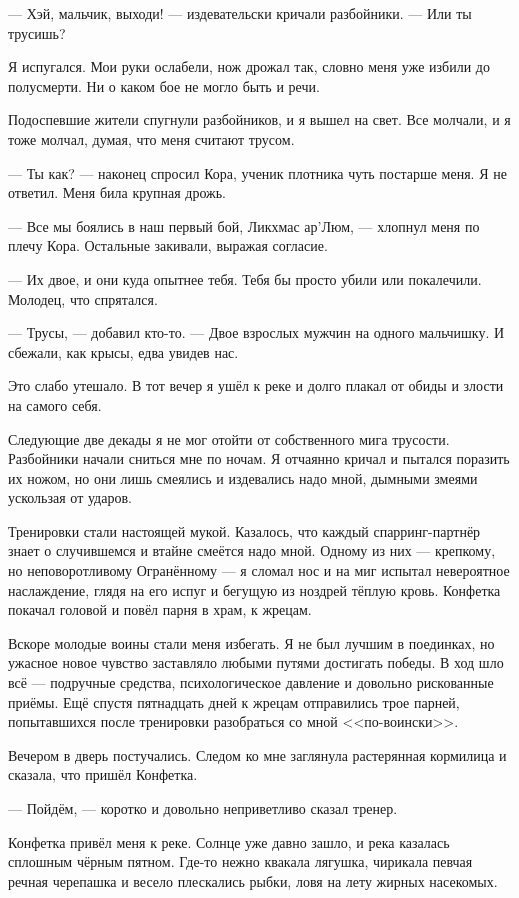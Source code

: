 --- Хэй, мальчик, выходи! --- издевательски кричали разбойники.
--- Или ты трусишь?

Я испугался.
Мои руки ослабели, нож дрожал так, словно меня уже избили до полусмерти.
Ни о каком бое не могло быть и речи.

Подоспевшие жители спугнули разбойников, и я вышел на свет.
Все молчали, и я тоже молчал, думая, что меня считают трусом.

--- Ты как? --- наконец спросил Кора, ученик плотника чуть постарше меня.
Я не ответил.
Меня била крупная дрожь.

--- Все мы боялись в наш первый бой, Ликхмас ар’Люм, --- хлопнул меня по плечу Кора.
Остальные закивали, выражая согласие.

--- Их двое, и они куда опытнее тебя.
Тебя бы просто убили или покалечили.
Молодец, что спрятался.

--- Трусы, --- добавил кто-то.
--- Двое взрослых мужчин на одного мальчишку.
И сбежали, как крысы, едва увидев нас.

Это слабо утешало.
В тот вечер я ушёл к реке и долго плакал от обиды и злости на самого себя.

\asterism

Следующие две декады я не мог отойти от собственного мига трусости.
Разбойники начали сниться мне по ночам.
Я отчаянно кричал и пытался поразить их ножом, но они лишь смеялись и издевались надо мной, дымными змеями ускользая от ударов.

Тренировки стали настоящей мукой.
Казалось, что каждый спарринг-партнёр знает о случившемся и втайне смеётся надо мной.
Одному из них --- крепкому, но неповоротливому Огранённому --- я сломал нос и на миг испытал невероятное наслаждение, глядя на его испуг и бегущую из ноздрей тёплую кровь.
Конфетка покачал головой и повёл парня в храм, к жрецам.

Вскоре молодые воины стали меня избегать.
Я не был лучшим в поединках, но ужасное новое чувство заставляло любыми путями достигать победы.
В ход шло всё --- подручные средства, психологическое давление и довольно рискованные приёмы.
Ещё спустя пятнадцать дней к жрецам отправились трое парней, попытавшихся после тренировки разобраться со мной <<по-воински>>.

Вечером в дверь постучались.
Следом ко мне заглянула растерянная кормилица и сказала, что пришёл Конфетка.

--- Пойдём, --- коротко и довольно неприветливо сказал тренер.

Конфетка привёл меня к реке.
Солнце уже давно зашло, и река казалась сплошным чёрным пятном.
Где-то нежно квакала лягушка, чирикала певчая речная черепашка и весело плескались рыбки, ловя на лету жирных насекомых.

